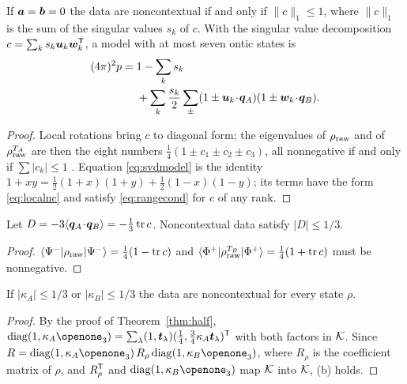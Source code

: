 \begin{corollary}
\label{cor:tstate}
If $\bm{a}=\bm{b}=0$ the data are noncontextual if and only if $\|c\|_1\le1$, where $\|c\|_1$ is the sum of the singular values $s_k$ of $c$. With the singular value decomposition $c=\sum_ks_k\bm{u}_k\bm{w}_k^{\mathsf{T}}$, a model with at most seven ontic states is
\begin{equation}
\begin{aligned}
(4\pi)^2p={}&1-\sum_ks_k\\
&+\sum_k\frac{s_k}{2}\sum_{\pm}(1\pm\bm{u}_k\!\cdot\!\bm{q}_A)(1\pm\bm{w}_k\!\cdot\!\bm{q}_B).
\end{aligned}
\label{eq:svdmodel}
\end{equation}
\end{corollary}

\begin{proof}
Local rotations bring $c$ to diagonal form; the eigenvalues of $\rho_{\mathrm{raw}}$ and of $\rho_{\mathrm{raw}}^{T_A}$ are then the eight numbers $\tfrac14(1\pm c_1\pm c_2\pm c_3)$, all nonnegative if and only if $\sum|c_k|\le1$ \cite{horodecki1996t}. Equation \eqref{eq:svdmodel} is the identity $1+xy=\tfrac12(1+x)(1+y)+\tfrac12(1-x)(1-y)$; its terms have the form \eqref{eq:localnc} and satisfy \eqref{eq:rangecond} for $c$ of any rank.
\end{proof}

\begin{corollary}
\label{cor:D}
Let $D=-3\langle\bm{q}_A\!\cdot\!\bm{q}_B\rangle=-\tfrac13\operatorname{tr} c$. Noncontextual data satisfy $|D|\le1/3$.
\end{corollary}

\begin{proof}
$\langle\Psi^-|\rho_{\mathrm{raw}}|\Psi^-\rangle=\tfrac14(1-\operatorname{tr} c)$ and $\langle\Phi^+|\rho_{\mathrm{raw}}^{T_B}|\Phi^+\rangle=\tfrac14(1+\operatorname{tr} c)$ must be nonnegative.
\end{proof}

\begin{corollary}
\label{cor:weak}
If $|\kappa_A|\le1/3$ or $|\kappa_B|\le1/3$ the data are noncontextual for every state $\rho$.
\end{corollary}

\begin{proof}
By the proof of Theorem~\ref{thm:half}, $\operatorname{diag}(1,\kappa_A\openone_3)=\sum_\lambda(1,\bt_\lambda)(\tfrac14,\tfrac34\kappa_A\bt_\lambda)^{\T}$ with both factors in $\mathcal{K}$. Since $\Rraw=\operatorname{diag}(1,\kappa_A\openone_3)\,R_\rho\operatorname{diag}(1,\kappa_B\openone_3)$, where $R_\rho$ is the coefficient matrix of $\rho$, and $R_\rho^{\mathsf{T}}$ and $\operatorname{diag}(1,\kappa_B\openone_3)$ map $\mathcal{K}$ into $\mathcal{K}$, (b) holds.
\end{proof}

